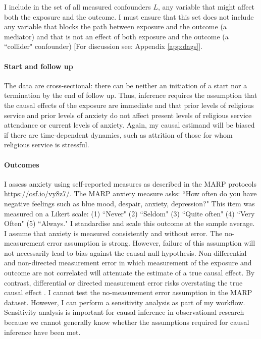 \documentclass[]{interact}
\theoremstyle{plain}%
\theoremstyle{definition}
\theoremstyle{remark}
\begin{document}
I include in the set of all measured confounders $L$, any variable that might affect both the exposure and the outcome. I must ensure that this set does not include any variable that blocks the path between exposure and the outcome (a mediator) and that is not an effect of both exposure and the outcome (a ``collider" confounder) \citep{mcelreath_statistical_2020,bulbulia_causal_2021}
[For discussion see: Appendix \ref{app:dags}].

\paragraph*{Start and follow up} The data are cross-sectional: there can be neither an initiation of a start nor a termination by the end of follow up. Thus, inference requires the assumption that the causal effects of the exposure are immediate and that prior levels of religious service and prior levels of anxiety do not affect present levels of religious service attendance or current levels of anxiety. Again, my causal estimand will be biased if there are time-dependent dynamics, such as attrition of those for whom religious service is stressful.

\paragraph*{Outcomes} I assess anxiety using self-reported measures as described in the MARP protocols \href{https://osf.io/vy8z7/}{https://osf.io/vy8z7/}. The MARP anxiety measure asks: “How often do you have negative feelings such as blue mood, despair, anxiety, depression?" This item was measured on a Likert scale: (1) “Never" (2) “Seldom" (3) “Quite often" (4) “Very Often" (5) “Always." I standardise and scale this outcome at the sample average. I assume that anxiety is measured consistently and without error. The no-measurement error assumption is strong. However, failure of this assumption will not necessarily lead to bias against the causal null hypothesis. Non differential and non-directed measurement error in which measurement of the exposure and outcome are not correlated will attenuate the estimate of a true causal effect. By contrast, differential or directed measurement error risks overstating the true causal effect \citep{hernan_causal_2020}. 
I cannot test the no-measurement error assumption in the MARP dataset. However, I can perform a sensitivity analysis as part of my workflow. Sensitivity analysis is important for causal inference in observational research because we cannot generally know whether the assumptions required for causal inference have been met.
\end{document}

